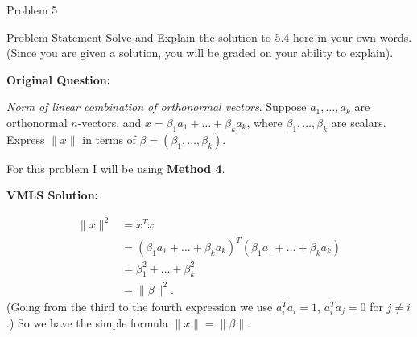\begin{problem}{Problem 5}
    \begin{statement}{Problem Statement}
        Solve and Explain the solution to 5.4 here in your own words. (Since you are given a solution, you will be graded on your ability to explain). \vspace*{1em}

        \textbf{Original Question:} \vspace*{1em}

        \textit{Norm of linear combination of orthonormal vectors}. Suppose $a_{1}, \dots , a_{k}$ are orthonormal $n$-vectors, and $x = \beta_{1}a_{1} + \dots + \beta_{k}a_{k}$, where $\beta_{1}, 
        \dots , \beta_{k}$ are scalars. Express $\| x \|$ in terms of $\beta = (\beta_{1}, \dots , \beta_{k})$.
    \end{statement}

    \begin{Highlight}[Solution]
        For this problem I will be using \textbf{Method 4}. \vspace*{1em}

        \textbf{VMLS Solution:}

        \begin{align*}
            \| x \|^{2} & = x^{T}x \\
            & = (\beta_{1}a_{1} + \dots + \beta_{k}a_{k})^{T}(\beta_{1}a_{1} + \dots + \beta_{k}a_{k}) \\
            & = \beta_{1}^{2} + \dots + \beta_{k}^{2} \\
            & = \| \beta \|^{2}.
        \end{align*}
        (Going from the third to the fourth expression we use $a_{i}^{T}a_{i} = 1$, $a_{i}^{T}a_{j} = 0$ for $j \neq i$.) So we have the simple formula $\|x\| = \|\beta\|$.
    \end{Highlight}
\end{problem}


